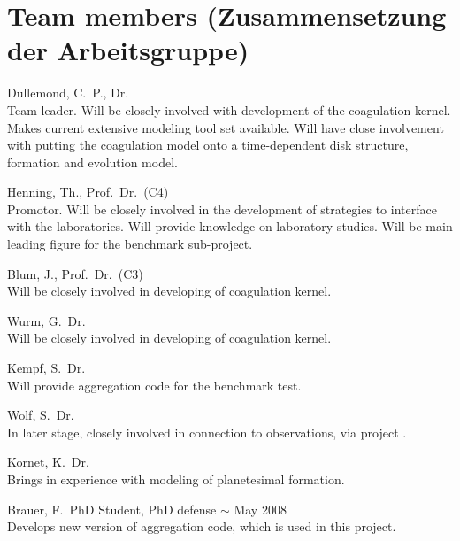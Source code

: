 \section{Team members (Zusammensetzung der Arbeitsgruppe)}
%
%
\begin{teamlist}
\item[Dullemond, C.~P., Dr.]\mbox{}\\
Team leader. Will be closely involved with development of the 
coagulation kernel. Makes current extensive modeling tool set
available. Will have close involvement with putting the
coagulation model onto a time-dependent disk structure, formation 
and evolution model.
\item[Henning, Th., Prof.~Dr.~(C4)]\mbox{}\\
Promotor. Will be closely involved in the development of strategies to
interface with the laboratories. Will provide knowledge on laboratory
studies.
Will be main leading figure for the benchmark sub-project.
\item[Blum, J., Prof.~Dr.~(C3)]\mbox{}\\
Will be closely involved in developing of coagulation kernel.
\item[Wurm, G.~Dr.]\mbox{}\\
Will be closely involved in developing of coagulation kernel.
\item[Kempf, S.~Dr.]\mbox{}\\
Will provide aggregation code for the benchmark test.
\item[Wolf, S.~Dr.]\mbox{}\\
In later stage, closely involved in connection to observations, via
project \projwolf{}.
\item[Kornet, K.~Dr.]\mbox{}\\
Brings in experience with modeling of planetesimal formation. 
\item[Brauer, F.~PhD Student, PhD defense $\sim$ May 2008]\mbox{}\\
Develops new version of aggregation code, which is used in this project. 
\end{teamlist}
\vspace{1em}




